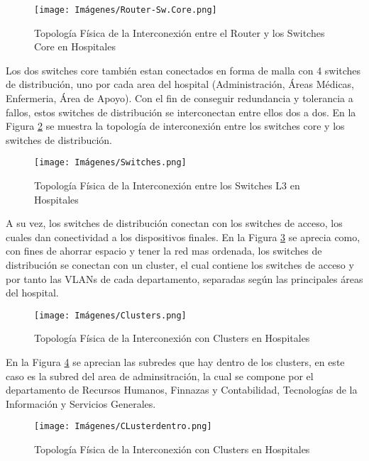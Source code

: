 \begin{figure}[H]
    \centering
    \texttt{[image: Imágenes/Router-Sw.Core.png]}
    \caption{Topología Física de la Interconexión entre el Router y los Switches Core en Hospitales}
    \label{fig:InterconexionRouHospitales}
\end{figure}

Los dos switches core también estan conectados en forma de malla con 4 switches de distribución, uno por cada area del hospital (Administración, Áreas Médicas, Enfermeria, Área de Apoyo). 
Con el fin de conseguir redundancia y tolerancia a fallos, estos switches de distribución se interconectan entre ellos dos a dos. En la Figura \ref{fig:InterconexionSwHospitales} se muestra la topología de interconexión entre los switches core y los switches de distribución.

\begin{figure}[H]
    \centering
    \texttt{[image: Imágenes/Switches.png]}
    \caption{Topología Física de la Interconexión entre los Switches L3 en Hospitales}
    \label{fig:InterconexionSwHospitales}
\end{figure}

A su vez, los switches de distribución conectan con los switches de acceso, los cuales dan conectividad a los dispositivos finales. En la Figura \ref{fig:CLustersHospitales} se aprecia como, con fines de 
ahorrar espacio y tener la red mas ordenada, los switches de distribución se conectan con un cluster, el cual contiene los switches de acceso y por tanto las VLANs de cada departamento, separadas 
según las principales áreas del hospital.

\begin{figure}[H]
    \centering
    \texttt{[image: Imágenes/Clusters.png]}
    \caption{Topología Física de la Interconexión con Clusters en Hospitales}
    \label{fig:CLustersHospitales}
\end{figure}

En la Figura \ref{fig:CLustersDentroHospitales} se aprecian las subredes que hay dentro de los clusters, en este caso es la subred del area de adminsitración, la cual se compone por el departamento de Recursos Humanos, Finnazas y Contabilidad, Tecnologías de la Información y Servicios Generales.
\begin{figure}[H]
    \centering
    \texttt{[image: Imágenes/CLusterdentro.png]}
    \caption{Topología Física de la Interconexión con Clusters en Hospitales}
    \label{fig:CLustersDentroHospitales}
\end{figure}


